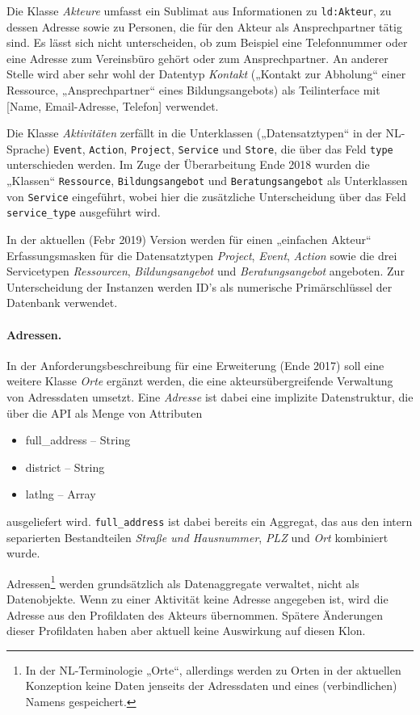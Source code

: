 \documentclass[a4paper,11pt]{article}
\begin{document}
Die Klasse \emph{Akteure} umfasst ein Sublimat aus Informationen zu
\texttt{ld:Akteur}, zu dessen Adresse sowie zu Personen, die für den Akteur
als Ansprechpartner tätig sind.  Es lässt sich nicht unterscheiden, ob zum
Beispiel eine Telefonnummer oder eine Adresse zum Vereinsbüro gehört oder zum
Ansprechpartner.  An anderer Stelle wird aber sehr wohl der Datentyp
\emph{Kontakt} („Kontakt zur Abholung“ einer Ressource, „Ansprechpartner“
eines Bildungsangebots) als Teilinterface mit [Name, Email-Adresse, Telefon]
verwendet.

Die Klasse \emph{Aktivitäten} zerfällt in die Unterklassen („Datensatztypen“
in der NL-Sprache) \texttt{Event}, \texttt{Action}, \texttt{Project},
\texttt{Service} und \texttt{Store}, die über das Feld \texttt{type}
unterschieden werden. Im Zuge der Überarbeitung Ende 2018 wurden die „Klassen“
\texttt{Ressource}, \texttt{Bildungsangebot} und \texttt{Beratungsangebot} als
Unterklassen von \texttt{Service} eingeführt, wobei hier die zusätzliche
Unterscheidung über das Feld \texttt{service\_type} ausgeführt wird.

In der aktuellen (Febr 2019) Version werden für einen „einfachen Akteur“
Erfassungsmasken für die Datensatztypen \emph{Project}, \emph{Event},
\emph{Action} sowie die drei Servicetypen \emph{Ressourcen},
\emph{Bildungsangebot} und \emph{Beratungsangebot} angeboten.  Zur
Unterscheidung der Instanzen werden ID's als numerische Primärschlüssel der
Datenbank verwendet.

\paragraph{Adressen.} 
In der Anforderungsbeschreibung für eine Erweiterung (Ende 2017) soll eine
weitere Klasse \emph{Orte} ergänzt werden, die eine akteursübergreifende
Verwaltung von Adressdaten umsetzt. Eine \emph{Adresse} ist dabei eine
implizite Datenstruktur, die über die API als Menge von Attributen
\begin{itemize}\itemsep0pt
  \item full\_address -- String
  \item district -- String
  \item latlng -- Array
\end{itemize}
ausgeliefert wird. \texttt{full\_address} ist dabei bereits ein Aggregat, das
aus den intern separierten Bestandteilen \emph{Straße und Hausnummer},
\emph{PLZ} und \emph{Ort} kombiniert wurde.

Adressen\footnote{In der NL-Terminologie „Orte“, allerdings werden zu Orten in
  der aktuellen Konzeption keine Daten jenseits der Adressdaten und eines
  (verbindlichen) Namens gespeichert.} werden grundsätzlich als Datenaggregate
verwaltet, nicht als Datenobjekte.  Wenn zu einer Aktivität keine Adresse
angegeben ist, wird die Adresse aus den Profildaten des Akteurs übernommen.
Spätere Änderungen dieser Profildaten haben aber aktuell keine Auswirkung auf
diesen Klon.
\end{document}
